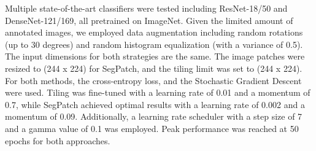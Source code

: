 \documentclass{article}
\begin{document}
Multiple state-of-the-art classifiers were tested including ResNet-18/50 and DenseNet-121/169, all pretrained on ImageNet.
Given the limited amount of annotated images, we employed data augmentation including random rotations (up to 30 degrees) and random histogram equalization (with a variance of 0.5). 
The input dimensions for both strategies are the same. The image patches were resized to (244 x 224) for SegPatch, and the tiling limit was set to (244 x 224).
For both methods, the cross-entropy loss, and the Stochastic Gradient Descent were used. 
Tiling was fine-tuned with a learning rate of 0.01 and a momentum of 0.7, while SegPatch achieved optimal results with a learning rate of 0.002 and a momentum of 0.09.
Additionally, a learning rate scheduler with a step size of 7 and a gamma value of 0.1 was employed. Peak performance was reached at 50 epochs for both approaches.



    
    
    

    
\end{document}
